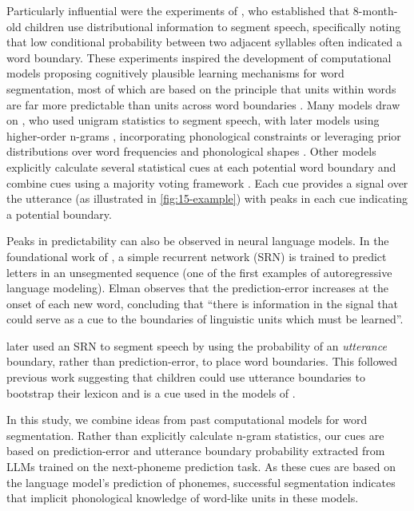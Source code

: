 Particularly influential were the experiments of \citet{Saffran1996learning}, who established that 8-month-old children use distributional information to segment speech, specifically noting that low conditional probability %
between two adjacent syllables often indicated a word boundary. These experiments inspired the development of computational models proposing cognitively plausible learning mechanisms for word segmentation, most of which are based on the principle that units within words are far more predictable than units across word boundaries \citep{harris1955}. Many models draw on \citet{Brent1999}, who used unigram statistics to segment speech, with later models using higher-order n-grams \citep{Venkataraman2001}, incorporating phonological constraints \citep{Blanchard2010} or leveraging prior distributions over word frequencies and phonological shapes \citep{Goldwater2009}. Other models explicitly calculate several statistical cues at each potential word boundary and combine cues using a majority voting framework \citep{ccoltekin2014explicit, Coltekin2017, goriely2023word}. Each cue provides a signal over the utterance (as illustrated in \cref{fig:15-example}) with peaks in each cue indicating a potential boundary. 

Peaks in predictability can also be observed in neural language models. In the foundational work of \citet{elman-1990-finding}, a simple recurrent network (SRN) is trained to predict letters in an unsegmented sequence (one of the first examples of autoregressive language modeling). Elman observes that the prediction-error increases at the onset of each new word, concluding that ``there is information in the signal that could serve as a cue to the boundaries of linguistic units which must be learned''.

\citet{christiansen1998learning} later used an SRN to segment speech by using the probability of an \emph{utterance} boundary, rather than prediction-error, to place word boundaries. This followed previous work suggesting that children could use utterance boundaries to bootstrap their lexicon \citep{aslin1996models} and is a cue used in the models of \citet{ccoltekin2014explicit, goriely2023word}.

In this study, we combine ideas from past computational models for word segmentation. Rather than explicitly calculate n-gram statistics, our cues are based on prediction-error and utterance boundary probability extracted from LLMs trained on the next-phoneme prediction task. As these cues are based on the language model's prediction of phonemes, successful segmentation indicates that implicit phonological knowledge of word-like units in these models. 

